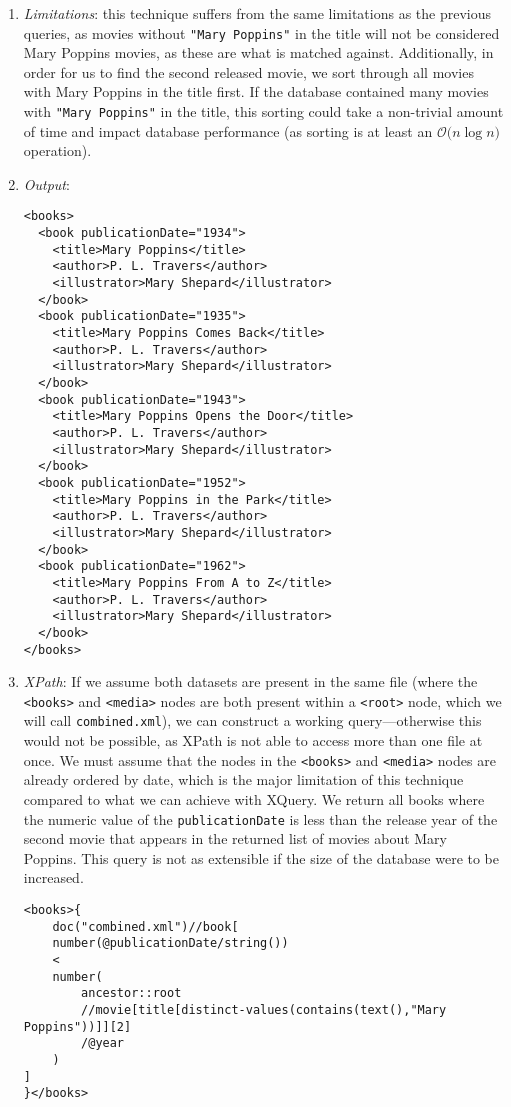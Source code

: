 \documentclass[11pt]{article}
\begin{document}
\begin{enumerate}
\item \textit{Limitations}: this technique suffers from the same limitations as the previous queries, as movies without \texttt{"Mary Poppins"} in the title will not be considered Mary Poppins movies, as these are what is matched against. Additionally, in order for us to find the second released movie, we sort through all movies with Mary Poppins in the title first. If the database contained many movies with \texttt{"Mary Poppins"} in the title, this sorting could take a non-trivial amount of time and impact database performance (as sorting is at least an $\mathcal{O}({n\log{n})}$ operation).
\item \textit{Output}:
\begin{verbatim} 
<books>
  <book publicationDate="1934">
    <title>Mary Poppins</title>
    <author>P. L. Travers</author>
    <illustrator>Mary Shepard</illustrator>
  </book>
  <book publicationDate="1935">
    <title>Mary Poppins Comes Back</title>
    <author>P. L. Travers</author>
    <illustrator>Mary Shepard</illustrator>
  </book>
  <book publicationDate="1943">
    <title>Mary Poppins Opens the Door</title>
    <author>P. L. Travers</author>
    <illustrator>Mary Shepard</illustrator>
  </book>
  <book publicationDate="1952">
    <title>Mary Poppins in the Park</title>
    <author>P. L. Travers</author>
    <illustrator>Mary Shepard</illustrator>
  </book>
  <book publicationDate="1962">
    <title>Mary Poppins From A to Z</title>
    <author>P. L. Travers</author>
    <illustrator>Mary Shepard</illustrator>
  </book>
</books>
\end{verbatim} 

\item \textit{XPath}: If we assume both datasets are present in the same file (where the \texttt{<books>} and \texttt{<media>} nodes are both present within a \texttt{<root>} node, which we will call \texttt{combined.xml}), we can construct a working query---otherwise this would not be possible, as XPath is not able to access more than one file at once. We must assume that the nodes in the \texttt{<books>} and \texttt{<media>} nodes are already ordered by date, which is the major limitation of this technique compared to what we can achieve with XQuery. We return all books where the numeric value of the \texttt{publicationDate} is less than the release year of the second movie that appears in the returned list of movies about Mary Poppins. This query is not as extensible if the size of the database were to be increased.

\begin{small}
\begin{verbatim}
<books>{
    doc("combined.xml")//book[
    number(@publicationDate/string())
    <
    number(
        ancestor::root
        //movie[title[distinct-values(contains(text(),"Mary Poppins"))]][2]
        /@year
    )
]
}</books>
\end{verbatim}
\end{small}
\end{enumerate}
\end{document}
